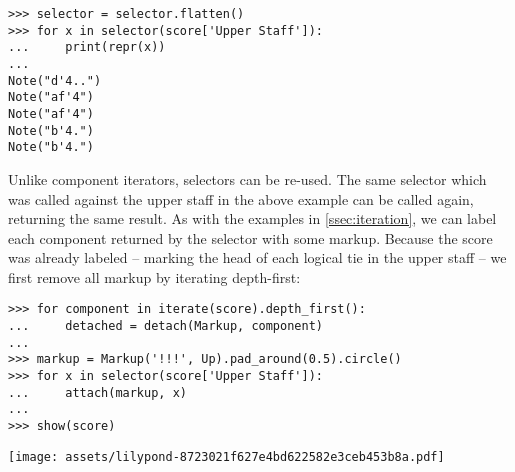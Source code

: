 \begin{comment}
<abjad>
selector = selector.flatten()
for x in selector(score['Upper Staff']):
    print(repr(x))

</abjad>
\end{comment}

\begin{abjadbookoutput}
\begin{singlespacing}
\vspace{-0.5\baselineskip}
\begin{lstlisting}
>>> selector = selector.flatten()
>>> for x in selector(score['Upper Staff']):
...     print(repr(x))
...
Note("d'4..")
Note("af'4")
Note("af'4")
Note("b'4.")
Note("b'4.")
\end{lstlisting}
\end{singlespacing}
\end{abjadbookoutput}

\noindent Unlike component iterators, selectors can be re-used. The same
selector which was called against the upper staff in the above example can be
called again, returning the same result. As with the examples in
\autoref{ssec:iteration}, we can label each component returned by the selector
with some markup. Because the score was already labeled -- marking the head of
each logical tie in the upper staff -- we first remove all markup by iterating
depth-first:

\begin{comment}
<abjad>
for component in iterate(score).depth_first():
    detached = detach(Markup, component)

markup = Markup('!!!', Up).pad_around(0.5).circle()
for x in selector(score['Upper Staff']):
    attach(markup, x)

show(score)
</abjad>
\end{comment}

\begin{abjadbookoutput}
\begin{singlespacing}
\vspace{-0.5\baselineskip}
\begin{lstlisting}
>>> for component in iterate(score).depth_first():
...     detached = detach(Markup, component)
...
>>> markup = Markup('!!!', Up).pad_around(0.5).circle()
>>> for x in selector(score['Upper Staff']):
...     attach(markup, x)
...
>>> show(score)
\end{lstlisting}
\noindent\texttt{[image: assets/lilypond-8723021f627e4bd622582e3ceb453b8a.pdf]}
\end{singlespacing}
\end{abjadbookoutput}

